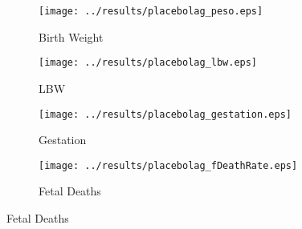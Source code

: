 \documentclass[12pt]{article}
\begin{document}
\begin{spacing}{1.4}
\begin{figure}[htpb!]
  \begin{center}
    \caption{Placebo Tests}
    \label{placebo}
    \begin{subfigure}{.5\textwidth}
      \centering
      \texttt{[image: ../results/placebolag\_peso.eps]}
      \caption{Birth Weight}
      \label{placebo-peso}
    \end{subfigure}%
    \begin{subfigure}{.5\textwidth}
      \centering
      \texttt{[image: ../results/placebolag\_lbw.eps]}
      \caption{LBW}
      \label{placebo-lbw}
    \end{subfigure}
    \begin{subfigure}{.5\textwidth}
      \centering
      \texttt{[image: ../results/placebolag\_gestation.eps]}
      \caption{Gestation}
      \label{placebo-gest}
    \end{subfigure}%
    \begin{subfigure}{.5\textwidth}
      \centering
      \texttt{[image: ../results/placebolag\_fDeathRate.eps]}
      \caption{Fetal Deaths}
      \label{placebo-fdeaths}
    \end{subfigure}
  \end{center}
\end{figure}


\end{spacing}
\end{document}

